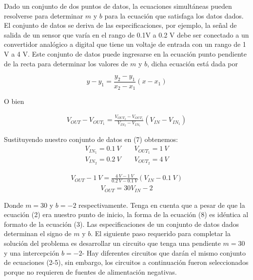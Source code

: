 \documentclass[12pt]{article}
\begin{document}
Dado un conjunto de dos puntos de datos, la ecuaciones simultáneas pueden resolverse para determinar $m$ y $b$ para la ecuación que satisfaga los datos dados. El conjunto de datos se deriva de las especificaciones, por ejemplo, la señal de salida de un sensor que varía en el rango de 0.1V a 0.2 V debe ser conectado a un convertidor analógico a digital que tiene un voltaje de entrada con un rango de 1 V a 4 V. Este conjunto de datos puede ingresarse en la ecuación punto pendiente de la recta para determinar los valores de $m$ y $b$, dicha ecuación está dada por
\begin{tcolorbox}[colback=red!5!white,colframe=red!75!black,arc=0mm,boxrule=0mm,width=(\linewidth+0.5cm)]
	\begin{equation}
		y-y_1 = \frac{y_2 - y_1}{x_2 - x_1}\left(x - x_1\right)
	\end{equation}
\end{tcolorbox}

O bien

\begin{align}
	V_{OUT} - V_{OUT_1} = \frac{V_{OUT_2} - V_{OUT_1}}{V_{IN_2} - V_{IN_1}}\left( V_{IN} - V_{IN_1} \right)
\end{align}

Sustituyendo nuestro conjunto de datos en (7) obtenemos:
\begin{align}
	V_{IN_1} = \SI{0.1}{V} \quad\quad V_{OUT_1} = \SI{1}{V}\nonumber\\
	V_{IN_2} = \SI{0.2}{V} \quad\quad V_{OUT_2} = \SI{4}{V}\nonumber 
\end{align}

\begin{align}
	V_{OUT} -\SI{1}{V}  = \frac{\SI{4}{V} - \SI{1}{V}}{\SI{0.2}{V} - \SI{0.1}{V}}\left( V_{IN} - \SI{0.1}{V} \right)\nonumber
\end{align}
\begin{align}
	V_{OUT} = 30V_{IN} - 2
\end{align}

Donde $m = 30$ y $b = -2$ respectivamente. Tenga en cuenta que a pesar de que la ecuación (2) era nuestro punto de inicio, la forma de la ecuación (8) es idéntica al formato de la ecuación (3). Las especificaciones de un conjunto de datos dados determinan el signo de $m$ y $b$. El siguiente paso requerido para completar la solución del problema es desarrollar un circuito que tenga una pendiente $m = 30$ y una intercepción $b = -2$- Hay diferentes circuitos que darán el mismo conjunto de ecuaciones (2-5), sin embargo, los circuitos a continuación fueron seleccionados porque no requieren de fuentes de alimentación negativas.
\end{document}
